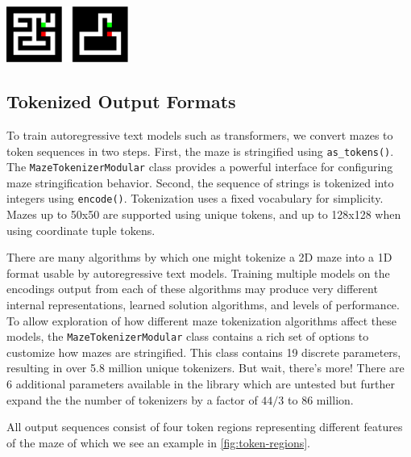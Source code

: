 \documentclass[10pt,a4paper,onecolumn]{article}
\let\origfigure\figure
\let\endorigfigure\endfigure
\renewenvironment{figure}[1][2] {
    \expandafter\origfigure\expandafter[H]
} {
    \endorigfigure
}
\begin{document}
\begin{figure}
\hypertarget{fig:e2h-raster}{%
\centering
\includegraphics[width=0.3\textwidth,height=\textheight]{figures/maze-raster-input-target.pdf}
\caption{Input is the rasterized maze without the path marked (left),
and provide as a target the maze with all but the correct path removed.
Configuration options exist to adjust whether endpoints are included and
if empty cells should be filled in.}\label{fig:e2h-raster}
}
\end{figure}

\hypertarget{tokenized-output-formats}{%
\subsection{Tokenized Output Formats}\label{tokenized-output-formats}}

To train autoregressive text models such as transformers, we convert
mazes to token sequences in two steps. First, the maze is stringified
using \texttt{as\_tokens()}. The \texttt{MazeTokenizerModular} class
provides a powerful interface for configuring maze stringification
behavior. Second, the sequence of strings is tokenized into integers
using \texttt{encode()}. Tokenization uses a fixed vocabulary for
simplicity. Mazes up to 50x50 are supported using unique tokens, and up
to 128x128 when using coordinate tuple tokens.

There are many algorithms by which one might tokenize a 2D maze into a
1D format usable by autoregressive text models. Training multiple models
on the encodings output from each of these algorithms may produce very
different internal representations, learned solution algorithms, and
levels of performance. To allow exploration of how different maze
tokenization algorithms affect these models, the
\texttt{MazeTokenizerModular} class contains a rich set of options to
customize how mazes are stringified. This class contains 19 discrete
parameters, resulting in over 5.8 million unique tokenizers. But wait,
there's more! There are 6 additional parameters available in the library
which are untested but further expand the the number of tokenizers by a
factor of \(44/3\) to 86 million.

All output sequences consist of four token regions representing
different features of the maze of which we see an example in
\autoref{fig:token-regions}.
\end{document}
